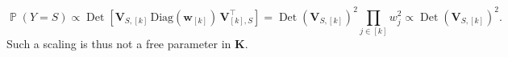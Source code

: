 \documentclass[twoside,11pt]{book}
\numberwithin{theorem}{chapter}
\numberwithin{definition}{chapter}
\numberwithin{proposition}{chapter}
\numberwithin{corollary}{chapter}
\numberwithin{example}{chapter}
\numberwithin{lemma}{chapter}
\DeclareMathOperator{\Det}{Det}
\DeclareMathOperator{\Cor}{\mathrm{Cor}}
\DeclareMathOperator{\Tran}{\intercal}
\DeclareMathOperator{\Prb}{\mathbb{P}}
\begin{document}
\begin{equation}
\Prb (Y=S) \propto \Det \left[\bm{V}^{}_{S, [k]} \,\text{Diag}(\bm{w}_{[k]})\, \bm{V}_{[k],S}^{\Tran}\right] = \Det(\bm{V}_{S,[k]})^{2} \prod\limits_{j \in [k]} w_{j}^{2}\propto \Det(\bm{V}_{S,[k]})^{2}.
\end{equation}
Such a scaling is thus not a free parameter in $\bm{K}$.

\end{document}
